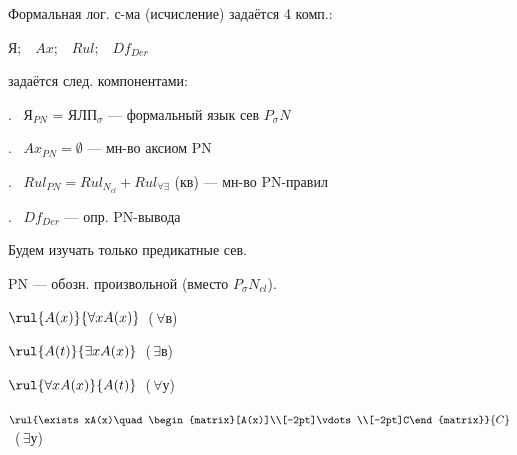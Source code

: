 
\newcommand{\pn}{\vdash_{PN}}\newcommand{\lp}{\models_{\text{лп}}}
\newcommand{\nm}[1]{\par\hangindent=8mm\hangafter=1\noindent #1\ }
\newcommand{\dd}[2]{\rul{#1}{#2}}
\shapka
{}
Формальная лог. с-ма (исчисление) задаётся 4 комп.:\par
\hspace*{20mm}Я;\ \ $Ax$;\ \ $Rul$;\ \ $Df_{Der}$\par
{} задаётся след. компонентами:
\nm{1.} Я$_{PN}$ = ЯЛП$_{\sigma}$ --- формальный язык сев $P_{\sigma} N$
\nm{2.} $Ax_{PN}=\emptyset$ --- мн-во аксиом PN
\nm{3.} $Rul_{PN}=Rul_{N_{cl}}+Rul_{\forall\exists}$ (кв) --- мн-во PN-правил
\nm{4.} $Df_{Der}$ --- опр. PN-вывода\par
Будем изучать только  предикатные сев.\par
PN --- обозн. произвольной  (вместо $P_{\sigma} N_{cl}$).\par\vspace{2mm}
\par\vspace{1mm}
\par\vspace{1mm}
\hspace*{10mm}$\rul{A(x)}{\forall xA(x)}$\ (\,$\forall$в) \par\vspace{2mm}
\hspace*{10mm}$\rul{A(t)}{\exists xA(x)}$\ (\,$\exists$в) \par\vspace{2mm}
\par\vspace{1mm}
\hspace*{10mm}$\rul{\forall xA(x)}{A(t)}$\ (\,$\forall$у) \par\vspace{2mm}
\hspace*{10mm}$\rul{\exists xA(x)\quad\begin{matrix}[A(x)]\\[-2pt]\vdots\\[-2pt]C\end{matrix}}{C}$\ (\,$\exists$у) \par\vspace{3mm}
